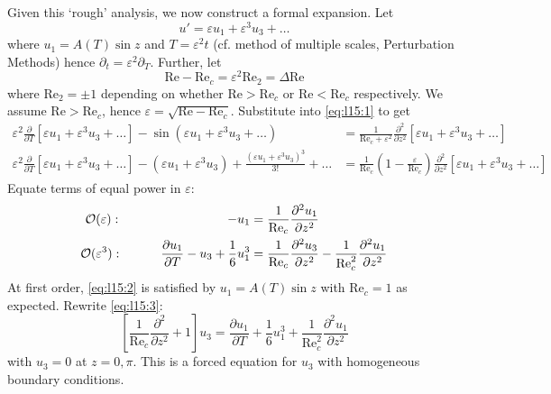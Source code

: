 \documentclass{jknotes}
\newcommand{\ReN}{\text{Re}}
\newcommand{\veps}{\varepsilon}
\begin{document}
Given this `rough' analysis, we now construct a formal expansion. Let
\begin{equation}
	u' = \veps u_1 + \veps^3 u_3 + \dots
\end{equation}
where $u_1 = A(T) \sin z$ and $T = \veps^2 t$ (cf. method of multiple scales,
Perturbation Methods) hence $\partial_t = \veps^2 \partial_T$. Further, let
\begin{equation}
	\ReN - \ReN_c = \veps^2 \ReN_2 = \Delta \ReN
\end{equation}
where $\ReN_2 = \pm 1$ depending on whether $\ReN > \ReN_c$ or $\ReN <
\ReN_c$ respectively. We assume $\ReN > \ReN_c$, hence $\veps = \sqrt{\ReN -
\ReN_c}$. Substitute into \eqref{eq:l15:1} to get
\begin{align}
	\veps^2 \frac{\partial}{\partial T}\left[ \veps u_1 + \veps^3 u_3 +
	\dots\right] - \sin(\veps u_1 + \veps^3 u_3 + \dots) &= \frac{1}{\ReN_c +
	\veps^2} \frac{\partial^2}{\partial z^2}\left[\veps u_1 + \veps^3 u_3 +
	\dots \right] \\
	\veps^2 \frac{\partial}{\partial T}\left[ \veps u_1 + \veps^3 u_3 + \dots
	\right] - (\veps u_1 + \veps^3 u_3) + \frac{(\veps u_1 + \veps^3
	u_3)^3}{3!} + \dots &= \frac{1}{\ReN_c}\left(1-\frac{\veps}{\ReN_c}\right)
	\frac{\partial^2}{\partial z^2}\left[ \veps u_1 + \veps^3 u_3 + \dots
	\right]
\end{align}
Equate terms of equal power in $\veps$:
\begin{align}
	\mathcal{O}(\veps): \hspace{8.35em}-u_1 &=\frac{1}{\ReN_c}\frac{\partial^2
	u_1}{\partial z^2}\label{eq:l15:2} \\
	\mathcal{O}(\veps^3): \hspace{3em}\frac{\partial u_1}{\partial T} - u_3 +
	\frac{1}{6}u_1^3 &= \frac{1}{\ReN_c}\frac{\partial^2 u_3}{\partial z^2} -
	\frac{1}{\ReN_c^2}\frac{\partial^2 u_1}{\partial z^2}\label{eq:l15:3}
\end{align}
At first order, \eqref{eq:l15:2} is satisfied by $u_1 = A(T)\sin z$ with
$\ReN_c = 1$ as expected. Rewrite \eqref{eq:l15:3}:
\begin{equation}
	\left[\frac{1}{\ReN_c} \frac{\partial^2}{\partial z^2} + 1 \right] u_3 =
	\frac{\partial u_1}{\partial T} + \frac{1}{6}u_1^3 + \frac{1}{\ReN^2_c}
	\frac{\partial^2 u_1}{\partial z^2} \label{eq:l15:4}
\end{equation}
with $u_3 = 0$ at $z=0,\pi$. This is a forced equation for $u_3$ with
homogeneous boundary conditions.
\end{document}
